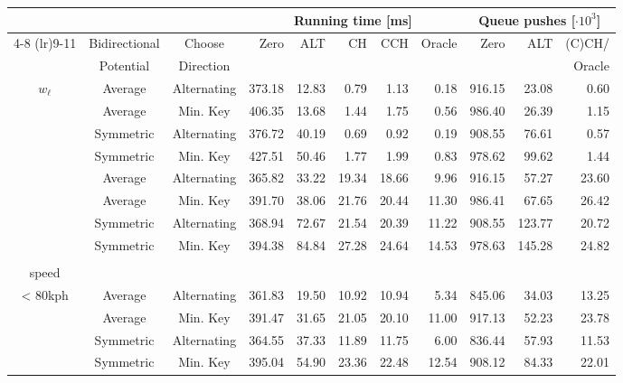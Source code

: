 \begin{tabular}{cccrrrrrrrr}
\toprule
 &  &  & \multicolumn{5}{c}{Running time [ms]} & \multicolumn{3}{c}{Queue pushes [$\cdot 10^3$]} \\ \cmidrule(lr){4-8} \cmidrule(lr){9-11}\multirow{2}{*}{$w_q$} & Bidirectional & Choose    & \multirow{2}{*}{Zero} & \multirow{2}{*}{ALT} & \multirow{2}{*}{CH} & \multirow{2}{*}{CCH} & \multirow{2}{*}{Oracle} & \multirow{2}{*}{Zero} & \multirow{2}{*}{ALT} & (C)CH/ \\
 & Potential     & Direction & & & & & & & & Oracle \\
\midrule
\multirow{4}{*}{$w_{\ell}$} &   Average &               Alternating &            373.18 & 12.83 &  0.79 &  1.13 &   0.18 &                     916.15 &  23.08 &         0.60 \\
           &   Average &                  Min. Key &            406.35 & 13.68 &  1.44 &  1.75 &   0.56 &                     986.40 &  26.39 &         1.15 \\
           & Symmetric &               Alternating &            376.72 & 40.19 &  0.69 &  0.92 &   0.19 &                     908.55 &  76.61 &         0.57 \\
           & Symmetric &                  Min. Key &            427.51 & 50.46 &  1.77 &  1.99 &   0.83 &                     978.62 &  99.62 &         1.44 \\
\addlinespace
     \multirow{4}{*}{$w_{\ell} \cdot 1.05$} &   Average &               Alternating &            365.82 & 33.22 & 19.34 & 18.66 &   9.96 &                     916.15 &  57.27 &        23.60 \\
           &   Average &                  Min. Key &            391.70 & 38.06 & 21.76 & 20.44 &  11.30 &                     986.41 &  67.65 &        26.42 \\
           & Symmetric &               Alternating &            368.94 & 72.67 & 21.54 & 20.39 &  11.22 &                     908.55 & 123.77 &        20.72 \\
           & Symmetric &                  Min. Key &            394.38 & 84.84 & 27.28 & 24.64 &  14.53 &                     978.63 & 145.28 &        24.82 \\
\addlinespace
   \multirow{4}{*}{\shortstack{$w_{\ell} \cdot 1.5$ if\\ speed \\ < 80kph}} &   Average &               Alternating &            361.83 & 19.50 & 10.92 & 10.94 &   5.34 &                     845.06 &  34.03 &        13.25 \\
           &   Average &                  Min. Key &            391.47 & 31.65 & 21.05 & 20.10 &  11.00 &                     917.13 &  52.23 &        23.78 \\
           & Symmetric &               Alternating &            364.55 & 37.33 & 11.89 & 11.75 &   6.00 &                     836.44 &  57.93 &        11.53 \\
           & Symmetric &                  Min. Key &            395.04 & 54.90 & 23.36 & 22.48 &  12.54 &                     908.12 &  84.33 &        22.01 \\
\bottomrule
\end{tabular}

